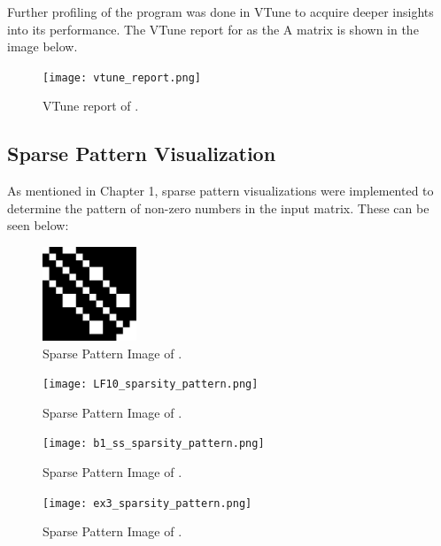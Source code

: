 \documentclass[12pt]{article}
\begin{document}
Further profiling of the program was done in VTune to acquire deeper insights into its performance. The VTune report for  as the A matrix is shown in the image below.

\begin{figure}[h]
  \centering
  \texttt{[image: vtune\_report.png]}
  \caption{VTune report of .}
  \label{fig:your_image}
\end{figure}

\newpage

\subsection{Sparse Pattern Visualization}

As mentioned in Chapter 1, sparse pattern visualizations were implemented to determine the pattern of non-zero numbers in the input matrix. These can be seen below:

\begin{figure}[h]
  \centering
  \includegraphics[width=0.25\textwidth]{LFAT5_sparsity_pattern.png}
  \caption{Sparse Pattern Image of .}
  \label{fig:your_image}
\end{figure}

\begin{figure}[h]
  \centering
  \texttt{[image: LF10\_sparsity\_pattern.png]}
  \caption{Sparse Pattern Image of .}
  \label{fig:your_image}
\end{figure}

\begin{figure}[h]
  \centering
  \texttt{[image: b1\_ss\_sparsity\_pattern.png]}
  \caption{Sparse Pattern Image of .}
  \label{fig:your_image}
\end{figure}

\begin{figure}[h]
  \centering
  \texttt{[image: ex3\_sparsity\_pattern.png]}
  \caption{Sparse Pattern Image of .}
  \label{fig:your_image}
\end{figure}
\end{document}
